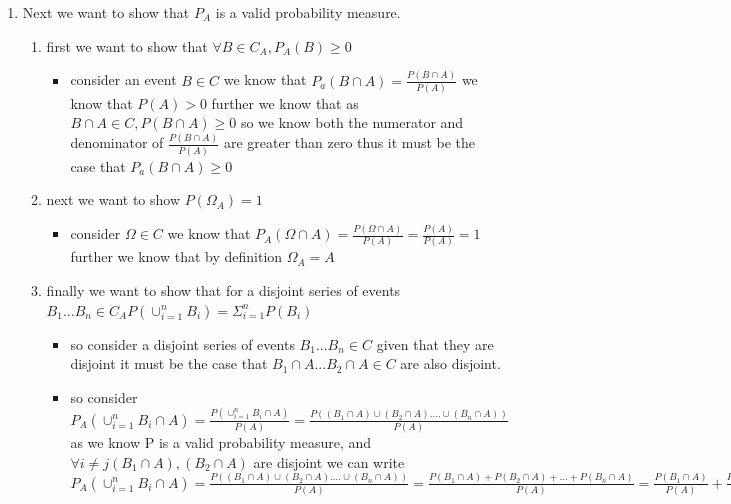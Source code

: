 \documentclass[12pt,twoside]{article}
\begin{document}
\begin{enumerate}
\begin{enumerate}
{\begin{enumerate}
\begin{enumerate}
    \begin{itemize}
        \item consider an event $B\in C$ by the properties of collections it must be the case that $B^c\in C$. thus by the definition of $C_A$ we know that $A\cap B \in C_A\text{ and } A \cap B^c \in C_A$
        \item by the law of total probability we know that the sample space of $C_A$ called $\Omega_A=A$ can be expressed as $A=(A\cap B) \cup (A\cap B^c)$ So thus by definition within $C_A$ $(A\cap B)^c=(A\cap B^c)$ which we showed above is in the set. proving feature three
    \end{itemize}
    \item thus $C_A$ is indeed a collection
    \end{enumerate}
    \item Next we want to show that $P_A$ is a valid probability measure. 
    \begin{enumerate}
        \item first we want to show that $\forall B \in C_A, P_A(B)\geq 0$
        \begin{itemize}
            \item consider an event $B\in C$ we know that $P_a(B\cap A)=\frac{P(B\cap A)}{P(A)}$ we know that $P(A)>0$  further we know that as $B\cap A \in C, P(B\cap A)\geq 0$ so we know both the numerator and denominator of $\frac{P(B\cap A)}{P(A)}$ are greater than zero thus it must be the case that $P_a(B\cap A)\geq 0$
        \end{itemize}
    \item next we want to show $P(\Omega_A)=1$
    \begin{itemize}
        \item consider $\Omega \in C$ we know that $P_A(\Omega \cap A)=\frac{P(\Omega \cap A)}{P(A)}=\frac{P(A)}{P(A)}=1$ further we know that by definition $\Omega_A=A$
    \end{itemize}
    \item finally we want to show that for a disjoint series of events $B_1...B_n \in C_A P(\cup_{i=1}^{n}B_i)=\Sigma_{i=1}^{n}P(B_i)$
    \begin{itemize}
        \item so consider a disjoint series of events  $B_1...B_n \in C$ given that they are disjoint it must be the case that $B_1\cap A...B_2\cap A \in C$ are also disjoint. 
        \item so consider $P_A(\cup_{i=1}^{n}B_i\cap A)=\frac{P(\cup_{i=1}^{n}B_i\cap A)}{P(A)}=\frac{P((B_1\cap A)\cup(B_2\cap A)....\cup(B_n\cap A) )}{P(A)}$ as we know P is a valid probability measure, and $\forall i\neq j(B_1\cap A), (B_2\cap A)$ are disjoint we can write $P_A(\cup_{i=1}^{n}B_i\cap A)=\frac{P((B_1\cap A)\cup(B_2\cap A)....\cup(B_n\cap A) )}{P(A)}=\frac{P(B_1\cap A)+P(B_2\cap A)+...+P(B_n\cap A) }{P(A)}=\frac{P(B_1 \cap A)}{P(A)}+\frac{P(B_2 \cap A)}{P(A)}+...+\frac{P(B_n \cap A)}{P(A)}=\Sigma_{i=1}^{n}\frac{P(B_i \cap A)}{P(A)}=\Sigma_{i=1}^{n}P_A(B_i\cap A)$

\end{itemize}
\end{enumerate}
\end{enumerate}}
\end{enumerate}
\end{enumerate}
\end{document}
